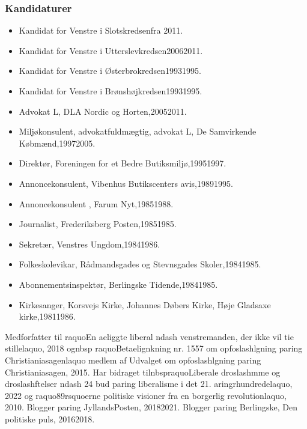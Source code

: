 \documentclass[11pt, a4paper]{awesome-cv}
\begin{document}
\begin{cvletter}
\subsubsection*{Kandidaturer}
\begin{itemize}
\item Kandidat for Venstre i Slotskredsenfra 2011.
\item Kandidat for Venstre i Utterslevkredsen20062011.
\item Kandidat for Venstre i Østerbrokredsen19931995.
\item Kandidat for Venstre i Brønshøjkredsen19931995.
\end{itemize}
\begin{itemize}
\item Advokat L, DLA Nordic og Horten,20052011.
\item Miljøkonsulent, advokatfuldmægtig, advokat L, De Samvirkende Købmænd,19972005.
\item Direktør, Foreningen for et Bedre Butiksmiljø,19951997.
\item Annoncekonsulent, Vibenhus Butikscenters avis,19891995.
\item Annoncekonsulent , Farum Nyt,19851988.
\item Journalist, Frederiksberg Posten,19851985.
\item Sekretær, Venstres Ungdom,19841986.
\item Folkeskolevikar, Rådmandsgades og Stevnsgades Skoler,19841985.
\item Abonnementsinspektør, Berlingske Tidende,19841985.
\item Kirkesanger, Korsvejs Kirke, Johannes Døbers Kirke, Høje Gladsaxe kirke,19811986.
\end{itemize}
Medforfatter til raquoEn aeliggte liberal ndash venstremanden, der ikke vil tie stillelaquo, 2018 ognbsp raquoBetaelignkning nr. 1557 om opfoslashlgning paring Christianiasagenlaquo medlem af Udvalget om opfoslashlgning paring Christianiasagen, 2015. Har bidraget tilnbspraquoLiberale droslashmme og droslashftelser ndash 24 bud paring liberalisme i det 21. aringrhundredelaquo, 2022 og raquo89rsquoerne  politiske visioner fra en borgerlig revolutionlaquo, 2010. Blogger paring JyllandsPosten, 20182021. Blogger paring Berlingske, Den politiske puls, 20162018.

\end{cvletter}
\end{document}
